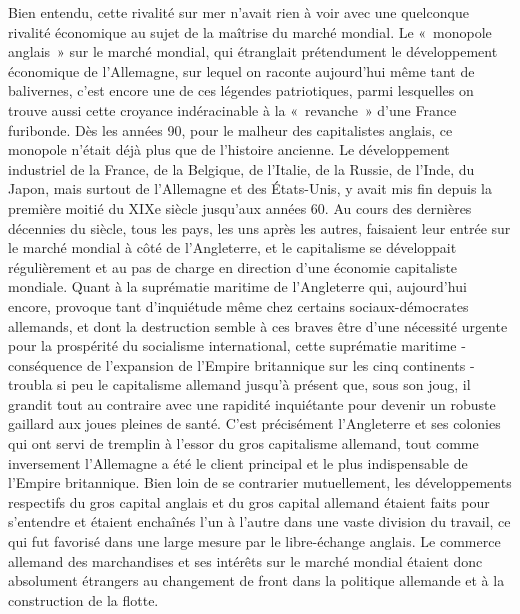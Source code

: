 \documentclass[french,twoside]{book} %
\begin{document}
Bien entendu, cette rivalité sur mer n’avait rien à voir avec une quelconque rivalité économique au sujet de la maîtrise du marché mondial. Le « monopole anglais » sur le marché mondial, qui étranglait prétendument le développement économique de l’Allemagne, sur lequel on raconte aujourd’hui même tant de balivernes, c’est encore une de ces légendes patriotiques, parmi lesquelles on trouve aussi cette croyance indéracinable à la « revanche » d’une France furibonde. Dès les années 90, pour le malheur des capitalistes anglais, ce monopole n’était déjà plus que de l’histoire ancienne. Le développement industriel de la France, de la Belgique, de l’Italie, de la Russie, de l’Inde, du Japon, mais surtout de l’Allemagne et des États-Unis, y avait mis fin depuis la première moitié du XIXe siècle jusqu’aux années 60. Au cours des dernières décennies du siècle, tous les pays, les uns après les autres, faisaient leur entrée sur le marché mondial à côté de l’Angleterre, et le capitalisme se développait régulièrement et au pas de charge en direction d’une économie capitaliste mondiale. Quant à la suprématie maritime de l’Angleterre qui, aujourd’hui encore, provoque tant d’inquiétude même chez certains sociaux-démocrates allemands, et dont la destruction semble à ces braves être d’une nécessité urgente pour la prospérité du socialisme international, cette suprématie maritime - conséquence de l’expansion de l’Empire britannique sur les cinq continents - troubla si peu le capitalisme allemand jusqu’à présent que, sous son joug, il grandit tout au contraire avec une rapidité inquiétante pour devenir un robuste gaillard aux joues pleines de santé. C'est précisément l’Angleterre et ses colonies qui ont servi de tremplin à l’essor du gros capitalisme allemand, tout comme inversement l’Allemagne a été le client principal et le plus indispensable de l’Empire britannique. Bien loin de se contrarier mutuellement, les développements respectifs du gros capital anglais et du gros capital allemand étaient faits pour s’entendre et étaient enchaînés l’un à l’autre dans une vaste division du travail, ce qui fut favorisé dans une large mesure par le libre-échange anglais. Le commerce allemand des marchandises et ses intérêts sur le marché mondial étaient donc absolument étrangers au changement de front dans la politique allemande et à la construction de la flotte.\par
\end{document}
